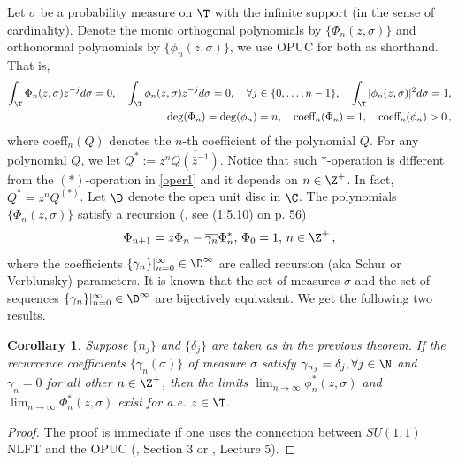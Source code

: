 \documentclass[twoside,a4paper]{amsart}
\newtheorem{corollary}[theorem]{Corollary}
\theoremstyle{remark}
\numberwithin{equation}{section}
\begin{document}
 Let $\sigma$ be a probability measure on $\T$ with the infinite support (in the sense of cardinality). Denote the monic orthogonal polynomials by $\{\Phi_n(z,\sigma)\}$ and orthonormal polynomials by $\{\phi_n(z,\sigma)\}$, we use OPUC for both as shorthand. That is, 
\begin{eqnarray*}
\int_\T \Phi_n(z,\sigma)z^{-j}d\sigma=0, \quad \int_\T \phi_n(z,\sigma)z^{-j}d\sigma=0, \quad \forall j\in \{0,\ldots, n-1\},\quad\int_\T |\phi_n(z,\sigma)|^2d\sigma=1, 
\\ \deg (\Phi_n)=\deg(\phi_n)=n, \quad 
\text{coeff}_n(\Phi_n)=1, \quad \text{coeff}_n(\phi_n)>0\,,
\end{eqnarray*}
where $\text{coeff}_n(Q)$ denotes the $n$-th coefficient of the polynomial $Q$. For any polynomial $Q$, we let $Q^*:=z^n\overline{Q(\bar{z}^{-1})}$. Notice that such $\ast$-operation is different from the $(\ast)$-operation in \eqref{oper1} and it depends on $n\in \Z^+$. In fact, $Q^*=z^nQ^{(*)}$. Let $\D$ denote the open unit disc in $\C$.
The polynomials $\{\Phi_n(z,\sigma)\}$ satisfy a recursion (\cite{bs}, see (1.5.10) on p. 56)
\[
\Phi_{n+1}=z\Phi_n-\overline{\gamma_n}\Phi_n^*, \, \Phi_0=1, \, n\in \Z^+\,,
\]
where the coefficients $\{\gamma_n\}|_{n=0}^\infty\in \D^\infty$ are called recursion (aka Schur or Verblunsky) parameters. It is known that the set of measures $\sigma$ and the set of sequences $\{\gamma_n\}|_{n=0}^\infty\in \D^\infty$ are bijectively equivalent.
We get the following two results.


 \begin{corollary}\label{c1} Suppose $\{n_j\}$ and $\{\delta_j\}$ are taken as in the previous theorem. If the recurrence coefficients $\{\gamma_n(\sigma)\}$ of measure $\sigma$ satisfy $\gamma_{n_j}=\delta_j, \forall j\in \N$ and $\gamma_n=0$ for all other $n\in \Z^+$, then the limits $\lim_{n\to\infty}\phi_n^*(z,\sigma)$ and $\lim_{n\to\infty}\Phi_n^*(z,\sigma)$ exist for a.e. $z\in \T$.
 \end{corollary}
\begin{proof} The proof is immediate if one uses the connection between $SU(1,1)$ NLFT and the OPUC (\cite{den26}, Section 3 or \cite{tt}, Lecture 5).\end{proof}
 
\end{document}
